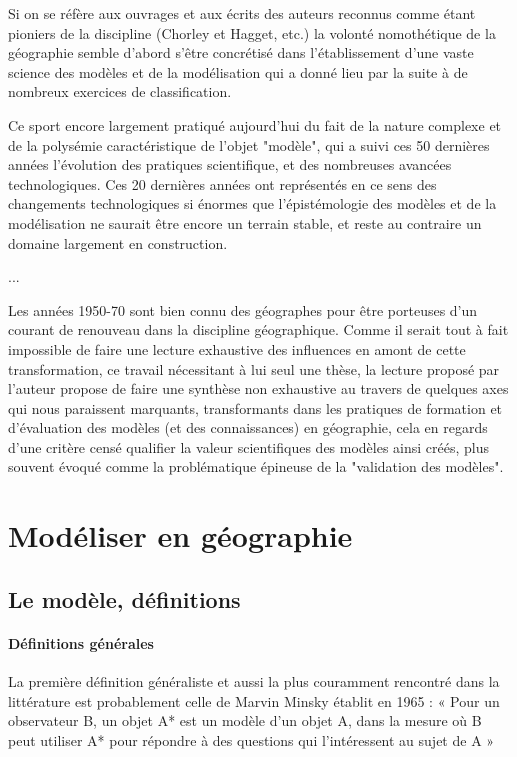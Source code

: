 Si on se réfère aux ouvrages et aux écrits des auteurs reconnus comme étant pioniers de la discipline (Chorley et Hagget, etc.) la volonté nomothétique de la géographie semble d'abord s'être concrétisé dans l'établissement d'une vaste science des modèles et de la modélisation qui a donné lieu par la suite à de nombreux exercices de classification.

 Ce sport encore largement pratiqué aujourd'hui du fait de la nature complexe et de la polysémie caractéristique de l'objet "modèle", qui a suivi ces 50 dernières années l'évolution des pratiques scientifique, et des nombreuses avancées technologiques. Ces 20 dernières années ont représentés en ce sens des changements technologiques si énormes que l'épistémologie des modèles et de la modélisation ne saurait être encore un terrain stable, et reste au contraire un domaine largement en construction. \autocite[12]{Varenne2012} \autocite[9]{Varenne2013}
 
 ...

Les années 1950-70 sont bien connu des géographes pour être porteuses d'un courant de renouveau dans la discipline géographique. Comme il serait tout à fait impossible de faire une lecture exhaustive des influences en amont de cette transformation, ce travail nécessitant à lui seul une thèse, la lecture proposé par l'auteur propose de faire une synthèse non exhaustive au travers de quelques axes qui nous paraissent marquants, transformants dans les pratiques de formation et d'évaluation des modèles (et des connaissances) en géographie, cela en regards d'une critère censé qualifier la valeur scientifiques des modèles ainsi créés, plus souvent évoqué comme la problématique épineuse de la "validation des modèles".

\section{Modéliser en géographie}

\subsection{Le modèle, définitions }


\paragraph{Définitions générales}

La première définition généraliste et aussi la plus couramment rencontré dans la littérature est probablement celle de Marvin Minsky établit en 1965 \autocite{Varenne2008} \autocite[15]{Varenne2013}  : « Pour un observateur B, un objet A* est un modèle d’un objet A, dans la mesure où B peut utiliser A* pour répondre à des questions qui l’intéressent au sujet de A » \autocite{Minsky1965}

